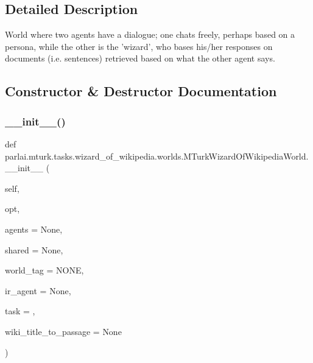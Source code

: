 \subsection{Detailed Description}
\begin{DoxyVerb}World where two agents have a dialogue; one chats freely, perhaps based on a
persona, while the other is the 'wizard', who bases his/her responses on documents
(i.e. sentences) retrieved based on what the other agent says.
\end{DoxyVerb}
 

\subsection{Constructor \& Destructor Documentation}
\mbox{\label{classparlai_1_1mturk_1_1tasks_1_1wizard__of__wikipedia_1_1worlds_1_1MTurkWizardOfWikipediaWorld_ae471a27f4c1d70786c2e56d99923cbbc}} 
\subsubsection{\texorpdfstring{\+\_\+\+\_\+init\+\_\+\+\_\+()}{\_\_init\_\_()}}
{\footnotesize\ttfamily def parlai.\+mturk.\+tasks.\+wizard\+\_\+of\+\_\+wikipedia.\+worlds.\+M\+Turk\+Wizard\+Of\+Wikipedia\+World.\+\_\+\+\_\+init\+\_\+\+\_\+ (\begin{DoxyParamCaption}\item[{}]{self,  }\item[{}]{opt,  }\item[{}]{agents = {\ttfamily None},  }\item[{}]{shared = {\ttfamily None},  }\item[{}]{world\+\_\+tag = {\ttfamily \textquotesingle{}NONE\textquotesingle{}},  }\item[{}]{ir\+\_\+agent = {\ttfamily None},  }\item[{}]{task = {\ttfamily \textquotesingle{}\textquotesingle{}},  }\item[{}]{wiki\+\_\+title\+\_\+to\+\_\+passage = {\ttfamily None} }\end{DoxyParamCaption})}




